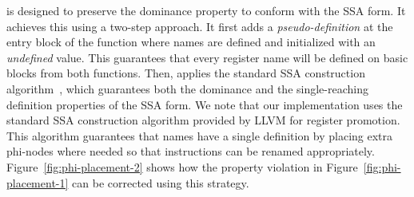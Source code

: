 



{\ProjName} is designed to preserve the dominance property to conform with the SSA form.
It achieves this using a two-step approach.
It first adds a \textit{pseudo-definition} at the entry block of the function where names are defined and initialized with an
\textit{undefined} value.
This guarantees that every register name will be defined on basic blocks from both functions.
Then, {\ProjName} applies the standard SSA construction algorithm~\cite{cytron89,cytron91}, which guarantees both the dominance and the
single-reaching definition properties of the SSA form.
We note that our implementation uses the standard SSA construction algorithm provided by LLVM for register promotion.
This algorithm guarantees that names have a single definition by placing extra phi-nodes where needed so that instructions can be renamed appropriately.
Figure~\ref{fig:phi-placement-2} shows how the property violation in Figure~\ref{fig:phi-placement-1} can be corrected using this strategy.



